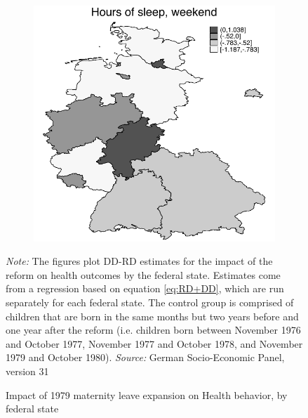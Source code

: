 \documentclass[a4paper ]{article}
\begin{document}
\begin{figure}[p]
\begin{subfigure}[h]{0.4\textwidth}\centering
	\includegraphics[width=\textwidth]{../../analysis/graphs/SOEP/LOChrsleep_wknd.pdf}
\end{subfigure}


\caption{Impact of 1979 maternity leave expansion on Health behavior, by federal state}\label{fig: LOC_HB}
\begin{minipage}{\textwidth} %
{\footnotesize \textit{Note:} The figures plot DD-RD estimates for the impact of the reform on health outcomes by the federal state. Estimates come from a regression based on equation \ref{eq:RD+DD}, which are run separately for each federal state. The control group is comprised of children that are born in the same months but two years before and one year after the reform (i.e. children born between November 1976 and October 1977, November 1977 and October 1978, and November 1979 and October 1980). \newline \textit{Source: }German Socio-Economic Panel, version 31\par}
\end{minipage}
\end{figure}    
    
    
    
    
    
    
    
\end{document}
